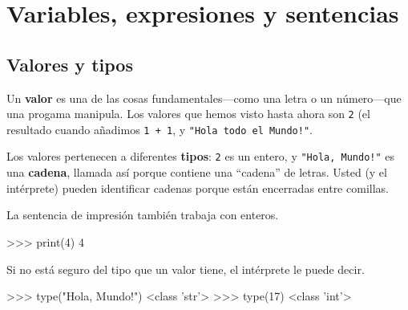 

\chapter{Variables, expresiones y sentencias}

\section{Valores y tipos}


Un {\bf valor} es una de las cosas fundamentales---como una letra o un 
número---que una progama manipula. Los valores que hemos visto hasta ahora
son \texttt{2} (el resultado cuando añadimos \texttt{1 + 1}, y
{\verb+"Hola todo el Mundo!"+}.

Los valores pertenecen a diferentes {\bf tipos}:
\texttt{2} es un entero, y {\verb+"Hola, Mundo!"+} es una {\bf cadena},
llamada así porque contiene una ``cadena'' de letras.
Usted (y el intérprete) pueden identificar cadenas porque  están
encerradas entre comillas.

La sentencia de impresión también trabaja con enteros.

\beforeverb
\begin{pyconcode}
>>> print(4)
4
\end{pyconcode}
\afterverb
%

Si no está seguro del tipo que un valor tiene, el intérprete le puede decir.

\beforeverb
\begin{pyconcode}
>>> type("Hola, Mundo!")
<class 'str'>
>>> type(17)
<class 'int'>
\end{pyconcode}
\afterverb
%


